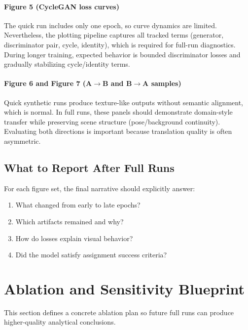 \documentclass[conference]{IEEEtran}
\begin{document}
\paragraph{Figure 5 (CycleGAN loss curves)}
The quick run includes only one epoch, so curve dynamics are limited. Nevertheless, the plotting pipeline captures all tracked terms (generator, discriminator pair, cycle, identity), which is required for full-run diagnostics. During longer training, expected behavior is bounded discriminator losses and gradually stabilizing cycle/identity terms.

\paragraph{Figure 6 and Figure 7 (A$\to$B and B$\to$A samples)}
Quick synthetic runs produce texture-like outputs without semantic alignment, which is normal. In full runs, these panels should demonstrate domain-style transfer while preserving scene structure (pose/background continuity). Evaluating both directions is important because translation quality is often asymmetric.

\subsection{What to Report After Full Runs}
For each figure set, the final narrative should explicitly answer:
\begin{enumerate}
\item What changed from early to late epochs?
\item Which artifacts remained and why?
\item How do losses explain visual behavior?
\item Did the model satisfy assignment success criteria?
\end{enumerate}

\section{Ablation and Sensitivity Blueprint}
This section defines a concrete ablation plan so future full runs can produce higher-quality analytical conclusions.
\end{document}
